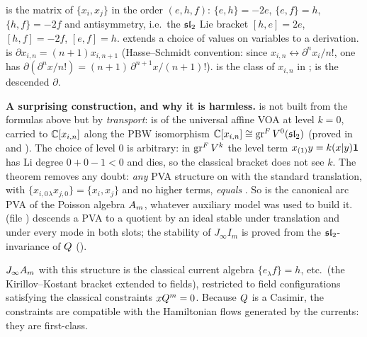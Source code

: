 \begin{dictionary}
 is the matrix of $\{x_i,x_j\}$ in the order $(e,h,f)$:
$\{e,h\}=-2e$, $\{e,f\}=h$, $\{h,f\}=-2f$ and antisymmetry, i.e.\ the $\mathfrak{sl}_2$ Lie bracket
$[h,e]=2e$, $[h,f]=-2f$, $[e,f]=h$.  extends a choice of values on variables to a
derivation.  is $\partial x_{i,n}=(n+1)x_{i,n+1}$ (Hasse--Schmidt convention: since
$x_{i,n}\leftrightarrow\partial^nx_i/n!$, one has $\partial(\partial^nx/n!)=(n+1)\,\partial^{n+1}x/(n+1)!$).
 is the class of $x_{i,n}$ in ;
 is the descended $\partial$.

\textbf{A surprising construction, and why it is harmless.}  is not built from the
formulas above but by \emph{transport}:  is  of the
universal affine VOA at level $k=0$, carried to ${\mathbb{C}}[x_{i,n}]$ along the PBW isomorphism
${\mathbb{C}}[x_{i,n}]\cong\operatorname{gr}^F V^0(\mathfrak{sl}_2)$ (proved in 
and ). The choice of level $0$ is arbitrary: in $\operatorname{gr}^F V^k$ the
level term $x_{(1)}y=k(x|y)\mathbf{1}$ has Li degree $0+0-1<0$ and dies, so the classical bracket does not
see $k$. The theorem  removes any doubt: \emph{any} PVA structure on
 with the standard translation, with $\{x_{i,0}{}_\lambda x_{j,0}\}=\{x_i,x_j\}$
and no higher terms, \emph{equals} . So  is the canonical arc PVA of the Poisson
algebra $A_m$, whatever auxiliary model was used to build it. 
(file ) descends a PVA to a quotient by an
ideal stable under translation and under every mode in both slots; the stability of $J_\infty I_m$ is proved
from the $\mathfrak{sl}_2$-invariance of $Q$ ().
\end{dictionary}

\begin{physics}
$J_\infty A_m$ with this structure is the classical current algebra $\{e_\lambda f\}=h$, etc.\ (the
Kirillov--Kostant bracket extended to fields), restricted to field configurations satisfying the classical
constraints $xQ^m=0$. Because $Q$ is a Casimir, the constraints are compatible with the
Hamiltonian flows generated by the currents: they are first-class.
\end{physics}

